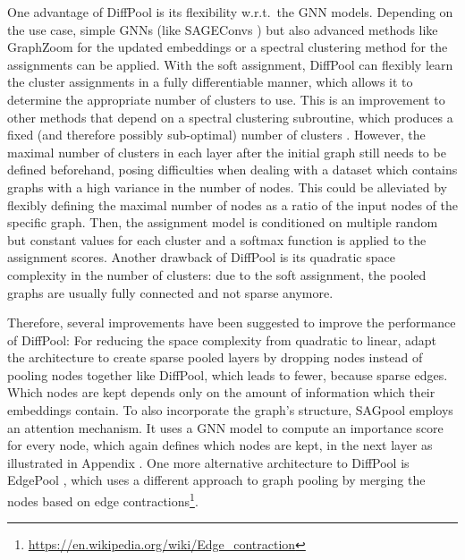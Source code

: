 \documentclass{article}
\begin{document}
One advantage of DiffPool is its flexibility w.r.t.\ the GNN models. Depending on the use case, simple GNNs (like SAGEConvs \cite{hamilton2017inductive}) but also advanced methods like GraphZoom for the updated embeddings or a spectral clustering method for the assignments can be applied.
With the soft assignment, DiffPool can flexibly learn the cluster assignments in a fully differentiable manner, which allows it to determine the appropriate number of clusters to use. This is an improvement to other methods that depend on a spectral clustering subroutine, which produces a fixed (and therefore possibly sub-optimal) number of clusters \cite{defferrard2016convolutional}. 
However, the maximal number of clusters in each layer after the initial graph still needs to be defined beforehand, posing difficulties when dealing with a dataset which contains graphs with a high variance in the number of nodes. This could be alleviated by flexibly defining the maximal number of nodes as a ratio of the input nodes of the specific graph. Then, the assignment model is conditioned on multiple random but constant values for each cluster and a softmax function is applied to the assignment scores. %
Another drawback of DiffPool is its quadratic space complexity in the number of clusters: due to the soft assignment, the pooled graphs are usually fully connected and not sparse anymore.%

Therefore, several improvements have been suggested to improve the performance of DiffPool: For reducing the space complexity from quadratic to linear, \citet{cangea2018towards} adapt the architecture to create sparse pooled layers by dropping nodes instead of pooling nodes together like DiffPool, which leads to fewer, because sparse edges. Which nodes are kept depends only on the amount of information which their embeddings contain. To also incorporate the graph's structure, SAGpool \cite{lee2019self} employs an attention mechanism. It uses a GNN model to compute an importance score for every node, which again defines which nodes are kept, in the next layer as illustrated in Appendix .
One more alternative architecture to DiffPool is EdgePool \cite{diehl2019edge}, which uses a different approach to graph pooling by merging the nodes based on edge contractions\footnote{\href{https://en.wikipedia.org/wiki/Edge\_contraction}{https://en.wikipedia.org/wiki/Edge\_contraction}}.
\end{document}
